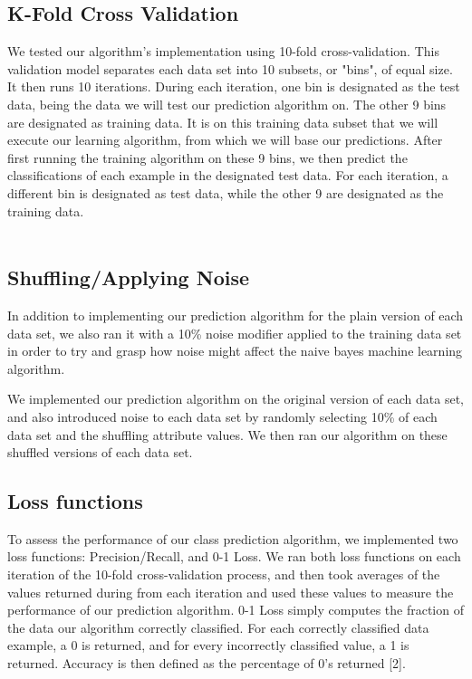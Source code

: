 \documentclass[twoside,11pt]{article}
\begin{document}
\subsection{K-Fold Cross Validation}
We tested our algorithm's implementation using 10-fold cross-validation. This validation model separates each data set into 10 subsets, or "bins", of equal size. It then runs 10 iterations. During each iteration, one bin is designated as the test data, being the data we will test our prediction algorithm on. The other 9 bins are designated as training data. It is on this training data subset that we will execute our learning algorithm, from which we will base our predictions. After first running the training algorithm on these 9 bins, we then predict the classifications of each example in the designated test data. For each iteration, a different bin is designated as test data, while the other 9 are designated as the training data. \\ \\

\subsection{Shuffling/Applying Noise}

In addition to implementing our prediction algorithm for the plain version of each data set, we also ran it with a 10\% noise modifier applied to the training data set in order to try and grasp how noise might affect the naive bayes machine learning algorithm. 

We implemented our prediction algorithm on the original version of each data set, and also introduced noise to each data set by randomly selecting 10\% of each data set and the shuffling attribute values. We then ran our algorithm on these shuffled versions of each data set.

\subsection{Loss functions}
To assess the performance of our class prediction algorithm, we implemented two loss functions: Precision/Recall, and 0-1 Loss. We ran both loss functions on each iteration of the 10-fold cross-validation process, and then took averages of the values returned during from each iteration and used these values to measure the performance of our prediction algorithm. 0-1 Loss simply computes the fraction of the data our algorithm correctly classified. For each correctly classified data example, a 0 is returned, and for every incorrectly classified value, a 1 is returned. Accuracy is then defined as the percentage of 0's returned [2].\\ \\
\end{document}
